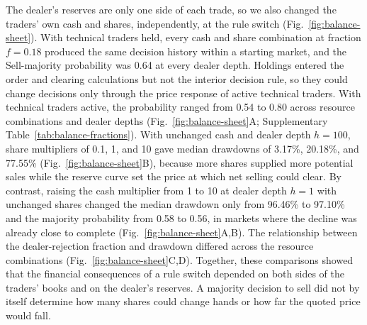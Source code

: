 The dealer's reserves are only one side of each trade, so we also
changed the traders' own cash and shares, independently, at the rule
switch (Fig.~\ref{fig:balance-sheet}). With technical traders held, every cash and
share combination at fraction $f=0.18$ produced the same decision
history within a starting market, and the Sell-majority probability was
0.64 at every dealer depth. Holdings entered the order and clearing
calculations but not the interior decision rule, so they could change
decisions only through the price response of active technical traders.
With technical traders active, the probability ranged from
0.54 to 0.80 across resource combinations and dealer depths
(Fig.~\ref{fig:balance-sheet}A; Supplementary Table~\ref{tab:balance-fractions}). With unchanged
cash and dealer depth $h=100$, share multipliers of 0.1, 1, and 10 gave
median drawdowns of 3.17\%, 20.18\%, and 77.55\%
(Fig.~\ref{fig:balance-sheet}B), because more shares supplied more potential sales
while the reserve curve set the price at which net selling could clear.
By contrast, raising the cash multiplier from 1 to 10 at dealer depth
$h=1$ with unchanged shares changed the median drawdown only from
96.46\% to 97.10\% and the majority probability from
0.58 to 0.56, in markets where the decline was already close to
complete (Fig.~\ref{fig:balance-sheet}A,B). The relationship between the
dealer-rejection fraction and drawdown differed across the resource
combinations (Fig.~\ref{fig:balance-sheet}C,D). Together, these comparisons showed
that the financial consequences of a rule switch depended on both sides
of the traders' books and on the dealer's reserves. A majority decision
to sell did not by itself determine how many shares could change hands
or how far the quoted price would fall.
